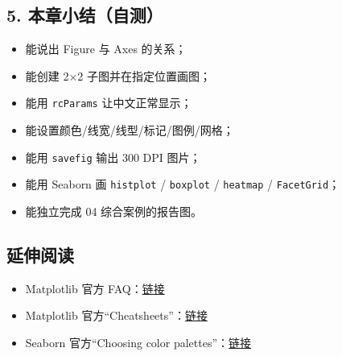 \subsection{5.
本章小结（自测）}\label{ux672cux7ae0ux5c0fux7ed3ux81eaux6d4b-2}

\begin{itemize}
\tightlist
\item[$\square$]
  能说出 Figure 与 Axes 的关系；
\item[$\square$]
  能创建 2×2 子图并在指定位置画图；
\item[$\square$]
  能用 \texttt{rcParams} 让中文正常显示；
\item[$\square$]
  能设置颜色/线宽/线型/标记/图例/网格；
\item[$\square$]
  能用 \texttt{savefig} 输出 300 DPI 图片；
\item[$\square$]
  能用 Seaborn 画 \texttt{histplot} / \texttt{boxplot} /
  \texttt{heatmap} / \texttt{FacetGrid}；
\item[$\square$]
  能独立完成 04 综合案例的报告图。
\end{itemize}

\subsection{延伸阅读}\label{ux5ef6ux4f38ux9605ux8bfb-25}

\begin{itemize}
\tightlist
\item
  Matplotlib 官方
  FAQ：\href{https://matplotlib.org/stable/faq/index.html}{链接}
\item
  Matplotlib
  官方``Cheatsheets''：\href{https://matplotlib.org/stable/cheatsheets/index.html}{链接}
\item
  Seaborn 官方``Choosing color
  palettes''：\href{https://seaborn.pydata.org/tutorial/color_palettes.html}{链接}
\end{itemize}

\newpage
